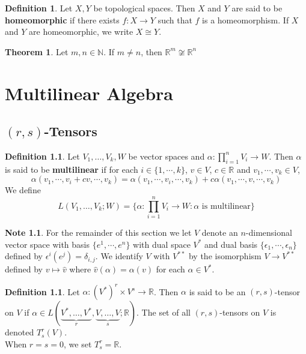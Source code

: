 \documentclass{book}
\theoremstyle{definition}
\newtheorem{defn}[definition]{Definition}
\newtheorem{note}[definition]{Note}
\newtheorem{thm}[definition]{Theorem}
\newcommand{\al}{\alpha}
\newcommand{\del}{\delta}
\newcommand{\ep}{\epsilon}
\newcommand{\N}{\mathbb{N}}
\newcommand{\R}{\mathbb{R}}
\DeclareMathOperator*{\0}{\mbf{0}}
\DeclareMathOperator*{\1}{\mbf{1}}
\begin{document}
\begin{defn}
Let $X, Y$ be topological spaces. Then $X$ and $Y$ are said to be \textbf{homeomorphic} if there exists $f:X \rightarrow Y$ such that $f$ is a homeomorphism. If $X$ and $Y$ are homeomorphic, we write $X \cong Y$. 
\end{defn}

\begin{thm}
Let $m,n \in \N$. If $m \neq n$, then $\R^m \not \cong \R^n$
\end{thm}






















\newpage
	\chapter{Multilinear Algebra}
	
	\section{$(r,s)$-Tensors}
	
	\begin{defn}
	Let $V_1, \dots, V_k, W$ be vector spaces and $\al : \prod_{i=1}^n V_i \rightarrow W$. Then $\al$ is said to be \textbf{multilinear} if for each $i \in \{1, \cdots, k\}$, $v \in V$, $c \in \R$ and $v_1, \cdots, v_k \in V$, $$\al(v_1, \cdots, v_i + cv, \cdots, v_k) = \al(v_1, \cdots, v_i, \cdots, v_k) + c\al(v_1, \cdots, v, \cdots, v_k)$$
	We define $$L(V_1, \dots, V_k; W) = \bigg \{\al : \prod_{i=1}^n V_i \rightarrow W: \al \text{ is multilinear} \bigg\}$$ 
	\end{defn}	
	
	\begin{note}
		For the remainder of this section we let $V$ denote an $n$-dimensional vector space with basis $\{e^1, \cdots, e^n\}$ with dual space $V^*$ and dual basis $\{\ep_1, \cdots, \ep_n\}$ defined by $\ep^i(e^j) = \del_{i,j}$. We identify $V$ with $V^{**}$ by the isomorphism $V \rightarrow V^{**}$ defined by $v \mapsto \hat{v}$ where $\hat{v}(\al) = \al(v)$ for each $\al \in V^*$. 
	\end{note}	
	
	\begin{defn}
	Let $\al: (V^*)^r \times V^s \rightarrow \R$. Then $\al$ is said to be an $(r,s)$-tensor on $V$ if $\al \in L(\underbrace{V^*, \dots, V^*}_{r}, \underbrace{V, \dots, V}_{s}; \R)$. The set of all $(r,s)$-tensors on $V$ is denoted $T^r_s(V)$. \\
	When $r=s=0$, we set $T^r_s = \R$.
	\end{defn}
	
\end{document}
